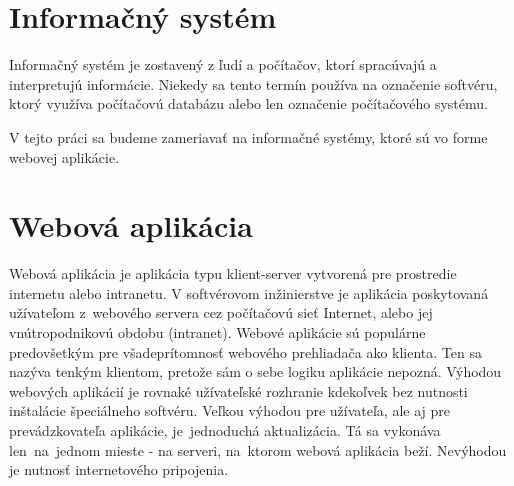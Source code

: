 \documentclass[a4paper, upjsfrontpage, disablespecwarning, thesismargins, thesislinespacing]{rnthesis}
\begin{document}

\section{Informačný systém}

Informačný systém je zostavený z ľudí a počítačov, ktorí spracúvajú a interpretujú informácie.
Niekedy sa tento termín používa na označenie softvéru, ktorý využíva počítačovú databázu alebo len označenie počítačového systému.
\cite{1}

V tejto práci sa budeme zameriavať na informačné systémy, ktoré sú vo forme webovej aplikácie.


\section{Webová aplikácia}

Webová aplikácia je aplikácia typu klient-server vytvorená pre prostredie internetu alebo intranetu.
V softvérovom inžinierstve je aplikácia poskytovaná užívateľom z~webového servera cez počítačovú sieť Internet, 
alebo jej vnútropodni\-kovú obdobu (intranet). 
Webové aplikácie sú populárne predovšetkým pre všade\-prítomnosť webového prehliadača ako klienta. 
Ten sa nazýva tenkým klientom, pretože sám o sebe logiku aplikácie nepozná.
Výhodou webových aplikácií je rovnaké užívateľské rozhranie kdekoľvek bez nutnosti inštalácie špeciálneho softvéru. 
Veľkou výhodou pre užívateľa, ale aj pre prevádzkovateľa aplikácie, je~jednoduchá aktualizácia. 
Tá sa vykonáva len~na~jednom mieste - na serveri, na~ktorom webová aplikácia beží. Nevýhodou je nutnosť internetového pripojenia.
\cite{2}

\end{document}
